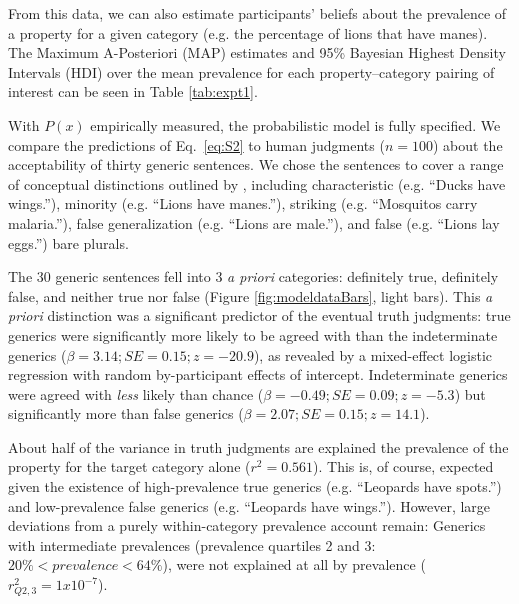 \documentclass[10pt,letterpaper]{article}
\begin{document}
From this data, we can also estimate participants' beliefs about the prevalence of a property for a given category (e.g. the percentage of lions that have manes). The Maximum A-Posteriori (MAP) estimates and 95\% Bayesian Highest Density Intervals (HDI) over the mean prevalence for each property--category pairing of interest can be seen in Table \ref{tab:expt1}. 

With $P(x)$ empirically measured, the probabilistic model is fully specified. 
We compare the predictions of Eq.~\ref{eq:S2} to human judgments ($n=100$) about the acceptability of thirty generic sentences. 
We chose the sentences to cover a range of conceptual distinctions outlined by , including characteristic (e.g. ``Ducks have wings.''), minority (e.g. ``Lions have manes.''), striking (e.g. ``Mosquitos carry malaria.''), false generalization (e.g. ``Lions are male.''), and false (e.g. ``Lions lay eggs.'') bare plurals.

The 30 generic sentences fell into 3 \emph{a priori} categories: definitely true, definitely false, and neither true nor false (Figure \ref{fig:modeldataBars}, light bars). 
This \emph{a priori} distinction was a significant predictor of the eventual truth judgments: true generics were significantly more likely to be agreed with than the indeterminate generics ($\beta = 3.14; SE = 0.15; z = -20.9$), as revealed by a mixed-effect logistic regression with random by-participant effects of intercept.
Indeterminate generics were agreed with \emph{less} likely than chance ($\beta = -0.49; SE = 0.09; z = -5.3$) but significantly more than false generics ($\beta = 2.07; SE = 0.15; z = 14.1$).

About half of the variance in truth judgments are explained the prevalence of the property for the target category alone ($r^2 = 0.561$). 
This is, of course, expected given the existence of high-prevalence true generics (e.g. ``Leopards have spots.'') and low-prevalence false generics (e.g. ``Leopards have wings.''). 
However, large deviations from a purely within-category prevalence account remain: Generics with intermediate prevalences (prevalence quartiles 2 and 3: $ 20\% < prevalence < 64\%$), were not explained at all by prevalence ($r_{Q2,3}^2 = 1 x 10^{-7}$).
\end{document}
